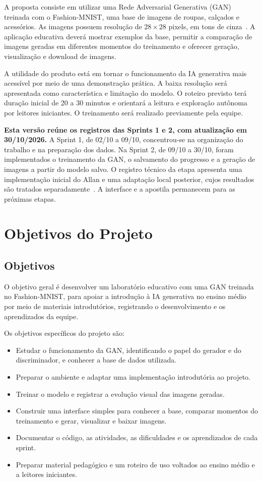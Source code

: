 \documentclass[12pt,a4paper]{article}
\begin{document}
A proposta consiste em utilizar uma Rede Adversarial Generativa (GAN) treinada com o Fashion-MNIST, uma base de imagens de roupas, calçados e acessórios. As imagens possuem resolução de $28\times28$ pixels, em tons de cinza~\cite{fashionmnist}. A aplicação educativa deverá mostrar exemplos da base, permitir a comparação de imagens geradas em diferentes momentos do treinamento e oferecer geração, visualização e download de imagens.

A utilidade do produto está em tornar o funcionamento da IA generativa mais acessível por meio de uma demonstração prática. A baixa resolução será apresentada como característica e limitação do modelo. O roteiro previsto terá duração inicial de 20 a 30 minutos e orientará a leitura e exploração autônoma por leitores iniciantes. O treinamento será realizado previamente pela equipe.

\textbf{Esta versão reúne os registros das Sprints 1 e 2, com atualização em 30/10/2026.} A Sprint 1, de 02/10 a 09/10, concentrou-se na organização do trabalho e na preparação dos dados. Na Sprint 2, de 09/10 a 30/10, foram implementados o treinamento da GAN, o salvamento do progresso e a geração de imagens a partir do modelo salvo. O registro técnico da etapa apresenta uma implementação inicial do Allan e uma adaptação local posterior, cujos resultados são tratados separadamente~\cite{registroS2}. A interface e a apostila permanecem para as próximas etapas.


\section{Objetivos do Projeto}
\subsection{Objetivos}
O objetivo geral é desenvolver um laboratório educativo com uma GAN treinada no Fashion-MNIST, para apoiar a introdução à IA generativa no ensino médio por meio de materiais introdutórios, registrando o desenvolvimento e os aprendizados da equipe.

Os objetivos específicos do projeto são:
\begin{itemize}
\item Estudar o funcionamento da GAN, identificando o papel do gerador e do discriminador, e conhecer a base de dados utilizada.
\item Preparar o ambiente e adaptar uma implementação introdutória ao projeto.
\item Treinar o modelo e registrar a evolução visual das imagens geradas.
\item Construir uma interface simples para conhecer a base, comparar momentos do treinamento e gerar, visualizar e baixar imagens.
\item Documentar o código, as atividades, as dificuldades e os aprendizados de cada sprint.
\item Preparar material pedagógico e um roteiro de uso voltados ao ensino médio e a leitores iniciantes.
\end{itemize}
\end{document}
